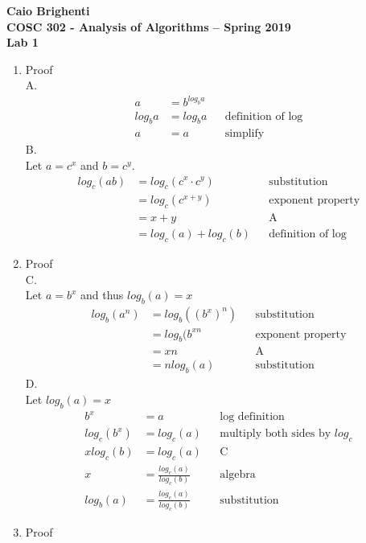 \documentclass{article}
\begin{document}
\noindent \textbf{Caio Brighenti }\\
\noindent \textbf{COSC 302 - Analysis of Algorithms -- Spring 2019}\\%
\noindent \textbf{Lab 1}\vspace{1em}\\
\begin{enumerate}
	\item Proof \\ 
	A.
		\begin{align}
			a &= b^{log_ba} \\
			log_ba&=log_ba  && \text{definition of log}  \\
			a&=a && \text{simplify}
		\end{align}
	B. \\
		Let $a=c^x$ and $b=c^y$. 
		\begin{align}
			log_c(ab) &= log_c(c^x \cdot c^y) && \text{substitution}\\
			&= log_c(c^{x+y}) && \text{exponent property} \\
			&= x+y && \text{A}\\
			&= log_c(a)+log_c(b) && \text{definition of log}
		\end{align}
		\item Proof \\ 
	C. \\
	Let $a=b^x$ and thus $log_b(a)=x$
		\begin{align}
			log_b(a^n) &= log_b((b^x)^n) && \text{substitution}\\
			&= log_b(b^{xn} && \text{exponent property} \\
			&= xn && \text{A} \\
			&= nlog_b(a) && \text{substitution} 
		\end{align}
	D. \\ 
	Let $log_b(a)=x$
			\begin{align}
			b^x&=a && \text{log definition}\\
			log_c(b^x) &= log_c(a) && \text{multiply both sides by $log_c$} \\
	        xlog_c(b) &= log_c(a) && \text{C} \\
	        x &= \frac{log_c(a)}{log_c(b)} && \text{algebra} \\
	        log_b(a) &= \frac{log_c(a)}{log_c(b)} && \text{substitution} 
		\end{align}
	\item Proof \\ 

\end{enumerate}
\end{document}
